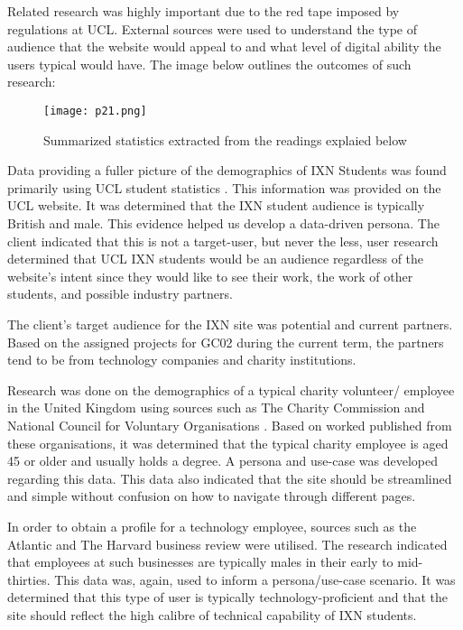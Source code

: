 Related research was highly important due to the red tape imposed by
regulations at UCL. External sources were used to understand the type of
audience that the website would appeal to and what level of digital
ability the users typical would have. The image below outlines the
outcomes of such research:

\begin{figure}[H]
      \centering
      \texttt{[image: p21.png]}
      \caption{Summarized statistics extracted from the readings explaied below}
 \end{figure}

Data providing a fuller picture of the demographics of IXN Students was
found primarily using UCL student statistics \cite{ps1}. This
information was provided on the UCL website. It was determined that the
IXN student audience is typically British and male. This evidence helped
us develop a data-driven persona. The client indicated that this is not
a target-user, but never the less, user research determined that UCL IXN
students would be an audience regardless of the website's intent since
they would like to see their work, the work of other students, and
possible industry partners.

The client's target audience for the IXN site was potential and current
partners. Based on the assigned projects for GC02 during the current
term, the partners tend to be from technology companies and charity
institutions.

Research was done on the demographics of a typical charity volunteer/
employee in the United Kingdom using sources such as The Charity
Commission \cite{ps2} and National Council for Voluntary Organisations
\cite{ps3}. Based on worked published from these organisations, it was
determined that the typical charity employee is aged 45 or older and
usually holds a degree. A persona and use-case was developed regarding
this data. This data also indicated that the site should be streamlined
and simple without confusion on how to navigate through different pages.

In order to obtain a profile for a technology employee, sources such as
the Atlantic \cite{ps4} and The Harvard business review \cite{ps5} were
utilised. The research indicated that employees at such businesses are
typically males in their early to mid-thirties. This data was, again,
used to inform a persona/use-case scenario. It was determined that this
type of user is typically technology-proficient and that the site should
reflect the high calibre of technical capability of IXN students.

